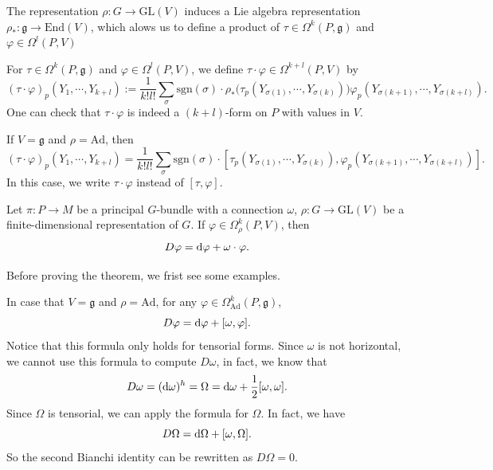 The representation $\rho:G\to \mathrm{GL}(V)$ induces a Lie algebra representation $\rho_*:\mathfrak{g}\to \mathrm{End}(V)$, 
which alows us to define a product of $\tau\in\Omega^k(P,\mathfrak{g})$ and $\varphi\in\Omega^l(P, V)$ 
\begin{definition}
    For $\tau\in\Omega^k(P,\mathfrak{g})$ and $\varphi\in\Omega^l(P, V)$, we define $\tau\cdot\varphi\in\Omega^{k+l}(P, V)$ by
    \begin{equation*}
        (\tau\cdot\varphi)_p(Y_1, \cdots, Y_{k+l}) := \frac{1}{k!l!}\sum_{\sigma} \mathrm{sgn}(\sigma)\cdot 
        \rho_*\big(\tau_p(Y_{\sigma(1)}, \cdots, Y_{\sigma(k)})\big)\varphi_p(Y_{\sigma(k+1)}, \cdots, Y_{\sigma(k+l)}).
    \end{equation*}
    One can check that $\tau\cdot\varphi$ is indeed a $(k+l)$-form on $P$ with values in $V$.
\end{definition}
\begin{example}
    If $V=\mathfrak{g}$ and $\rho=\mathrm{Ad}$, then 
    \begin{equation*}
        (\tau\cdot\varphi)_p(Y_1, \cdots, Y_{k+l}) = \frac{1}{k!l!}\sum_{\sigma} \mathrm{sgn}(\sigma)\cdot 
        [\tau_p(Y_{\sigma(1)}, \cdots, Y_{\sigma(k)}), \varphi_p(Y_{\sigma(k+1)}, \cdots, Y_{\sigma(k+l)})].
    \end{equation*}
    In this case, we write $\tau\cdot\varphi$ instead of $[\tau, \varphi]$.
\end{example}
\begin{theorem}\label{thm:formula-for-covariant-derivative}
    Let $\pi: P\to M$ be a principal $G$-bundle with a connection $\omega$, 
    $\rho:G\to \mathrm{GL}(V)$ be a finite-dimensional representation of $G$. 
    If $\varphi\in\Omega^k_{\rho}(P, V)$, then 
    \begin{equation*}
        D\varphi = {\rm d}\varphi + \omega\cdot\varphi.
    \end{equation*}
\end{theorem}
Before proving the theorem, we frist see some examples. 
\begin{example}
    In case that $V=\mathfrak{g}$ and $\rho=\mathrm{Ad}$, for any $\varphi\in\Omega^k_{\mathrm{Ad}}(P, \mathfrak{g})$, 
    \begin{equation*}
        D\varphi = {\rm d}\varphi + [\omega, \varphi].
    \end{equation*}
    Notice that this formula only holds for tensorial forms. Since $\omega$ is not horizontal, 
    we cannot use this formula to compute $D\omega$, in fact, we know that 
    \begin{equation*}
        D\omega = ({\rm d}\omega)^h = \Omega = {\rm d}\omega + \frac{1}{2}[\omega, \omega].
    \end{equation*}
    Since $\Omega$ is tensorial, we can apply the formula for $\Omega$. In fact, we have
    \begin{equation*}
        D\Omega = {\rm d}\Omega + [\omega, \Omega].
    \end{equation*}
    So the second Bianchi identity can be rewritten as $D\Omega=0$.
\end{example}
